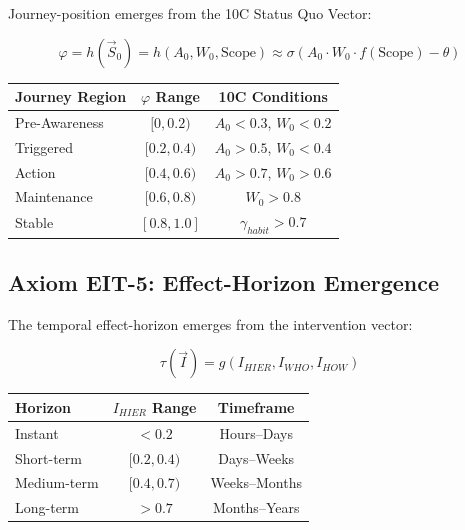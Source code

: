Journey-position emerges from the 10C Status Quo Vector:

\begin{equation}
\boxed{
\varphi = h(\vec{S}_0) = h(A_0, W_0, \text{Scope}) \approx \sigma(A_0 \cdot W_0 \cdot f(\text{Scope}) - \theta)
}
\label{eq:mp-journey-emergence}
\end{equation}

\begin{center}
\renewcommand{\arraystretch}{1.2}
\begin{tabular}{@{}lcc@{}}
\toprule
\textbf{Journey Region} & \textbf{$\varphi$ Range} & \textbf{10C Conditions} \\
\midrule
Pre-Awareness & $[0, 0.2)$ & $A_0 < 0.3$, $W_0 < 0.2$ \\
Triggered & $[0.2, 0.4)$ & $A_0 > 0.5$, $W_0 < 0.4$ \\
Action & $[0.4, 0.6)$ & $A_0 > 0.7$, $W_0 > 0.6$ \\
Maintenance & $[0.6, 0.8)$ & $W_0 > 0.8$ \\
Stable & $[0.8, 1.0]$ & $\gamma_{habit} > 0.7$ \\
\bottomrule
\end{tabular}
\end{center}

\subsection{Axiom EIT-5: Effect-Horizon Emergence}

The temporal effect-horizon emerges from the intervention vector:

\begin{equation}
\boxed{
\tau(\vec{I}) = g(I_{HIER}, I_{WHO}, I_{HOW})
}
\label{eq:mp-horizon-emergence}
\end{equation}

\begin{center}
\renewcommand{\arraystretch}{1.2}
\begin{tabular}{@{}lcc@{}}
\toprule
\textbf{Horizon} & \textbf{$I_{HIER}$ Range} & \textbf{Timeframe} \\
\midrule
Instant & $< 0.2$ & Hours--Days \\
Short-term & $[0.2, 0.4)$ & Days--Weeks \\
Medium-term & $[0.4, 0.7)$ & Weeks--Months \\
Long-term & $> 0.7$ & Months--Years \\
\bottomrule
\end{tabular}
\end{center}

